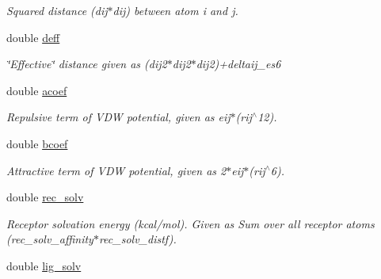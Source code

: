 \begin{DoxyCompactItemize}
\begin{DoxyCompactList}\small\item\em Squared distance (dij$\ast$dij) between atom i and j. \item\end{DoxyCompactList}\item 
\hypertarget{classENERGY_a0b0ffeca2fb48b6d54dfbd380d6e2664}{
double \hyperlink{classENERGY_a0b0ffeca2fb48b6d54dfbd380d6e2664}{deff}}
\label{classENERGY_a0b0ffeca2fb48b6d54dfbd380d6e2664}

\begin{DoxyCompactList}\small\item\em \char`\"{}Effective\char`\"{} distance given as (dij2$\ast$dij2$\ast$dij2)+deltaij\_\-es6 \item\end{DoxyCompactList}\item 
\hypertarget{classENERGY_ad6e0badc95381c69d406461a4b82b62d}{
double \hyperlink{classENERGY_ad6e0badc95381c69d406461a4b82b62d}{acoef}}
\label{classENERGY_ad6e0badc95381c69d406461a4b82b62d}

\begin{DoxyCompactList}\small\item\em Repulsive term of VDW potential, given as eij$\ast$(rij$^\wedge$12). \item\end{DoxyCompactList}\item 
\hypertarget{classENERGY_a32cd90b52dc94e3c4e2d05498cd85458}{
double \hyperlink{classENERGY_a32cd90b52dc94e3c4e2d05498cd85458}{bcoef}}
\label{classENERGY_a32cd90b52dc94e3c4e2d05498cd85458}

\begin{DoxyCompactList}\small\item\em Attractive term of VDW potential, given as 2$\ast$eij$\ast$(rij$^\wedge$6). \item\end{DoxyCompactList}\item 
\hypertarget{classENERGY_a4875430a612bac0905837b8a06a81f9b}{
double \hyperlink{classENERGY_a4875430a612bac0905837b8a06a81f9b}{rec\_\-solv}}
\label{classENERGY_a4875430a612bac0905837b8a06a81f9b}

\begin{DoxyCompactList}\small\item\em Receptor solvation energy (kcal/mol). Given as Sum over all receptor atoms (rec\_\-solv\_\-affinity$\ast$rec\_\-solv\_\-distf). \item\end{DoxyCompactList}\item 
\hypertarget{classENERGY_a28bfd0ebbeb592bc29d3362a0dbd678a}{
double \hyperlink{classENERGY_a28bfd0ebbeb592bc29d3362a0dbd678a}{lig\_\-solv}}
\label{classENERGY_a28bfd0ebbeb592bc29d3362a0dbd678a}


\end{DoxyCompactItemize}
